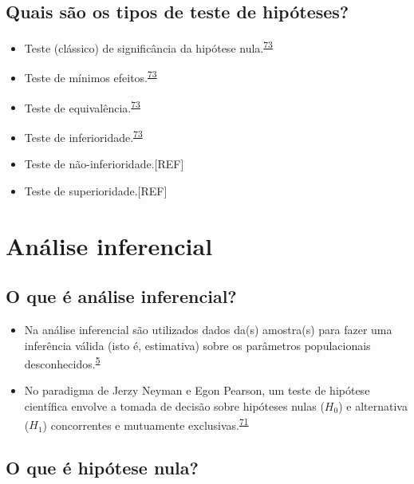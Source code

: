 \documentclass[
]{book}
\begin{document}
\hypertarget{quais-suxe3o-os-tipos-de-teste-de-hipuxf3teses}{%
\subsection{Quais são os tipos de teste de hipóteses?}\label{quais-suxe3o-os-tipos-de-teste-de-hipuxf3teses}}

\begin{itemize}
\item
  Teste (clássico) de significância da hipótese nula.\textsuperscript{\protect\hyperlink{ref-lakens2018}{73}}
\item
  Teste de mínimos efeitos.\textsuperscript{\protect\hyperlink{ref-lakens2018}{73}}
\item
  Teste de equivalência.\textsuperscript{\protect\hyperlink{ref-lakens2018}{73}}
\item
  Teste de inferioridade.\textsuperscript{\protect\hyperlink{ref-lakens2018}{73}}
\item
  Teste de não-inferioridade.{[}REF{]}
\item
  Teste de superioridade.{[}REF{]}
\end{itemize}

\hypertarget{inferencial}{%
\section{Análise inferencial}\label{inferencial}}

\hypertarget{o-que-uxe9-anuxe1lise-inferencial}{%
\subsection{O que é análise inferencial?}\label{o-que-uxe9-anuxe1lise-inferencial}}

\begin{itemize}
\item
  Na análise inferencial são utilizados dados da(s) amostra(s) para fazer uma inferência válida (isto é, estimativa) sobre os parâmetros populacionais desconhecidos.\textsuperscript{\protect\hyperlink{ref-vetter2017}{5}}
\item
  No paradigma de Jerzy Neyman e Egon Pearson, um teste de hipótese científica envolve a tomada de decisão sobre hipóteses nulas (\(H_{0}\)) e alternativa (\(H_{1}\)) concorrentes e mutuamente exclusivas.\textsuperscript{\protect\hyperlink{ref-Curran-Everett2009}{71}}
\end{itemize}

\hypertarget{o-que-uxe9-hipuxf3tese-nula}{%
\subsection{O que é hipótese nula?}\label{o-que-uxe9-hipuxf3tese-nula}}
\end{document}
